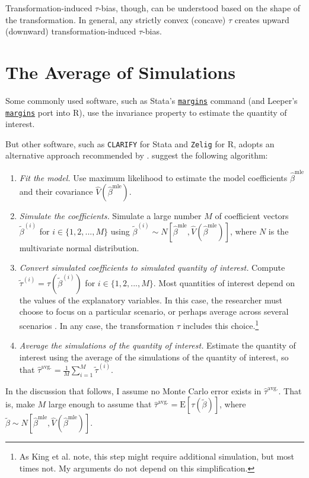 \documentclass[10pt]{article}
\begin{document}
Transformation-induced $\tau$-bias, though, can be understood based on the shape of the transformation. 
In general, any strictly convex (concave) $\tau$ creates upward (downward) transformation-induced $\tau$-bias. 

\section*{The Average of Simulations}

Some commonly used software, such as Stata's \href{https://www.stata.com/help.cgi?margins}{\texttt{margins}} command (and Leeper's \href{https://github.com/leeper/margins}{\texttt{margins}} port into R), use the invariance property to estimate the quantity of interest. 

But other software, such as \texttt{CLARIFY} for Stata and \texttt{Zelig} for R, adopts an alternative approach recommended by \cite{KingTomzWittenberg2000}. \cite{KingTomzWittenberg2000} suggest the following algorithm: 

\begin{enumerate}
\item \textit{Fit the model.} 
Use maximum likelihood to estimate the model coefficients $\hat{\beta}^{\text{mle}}$ and their covariance $\hat{V} \left( \hat{\beta}^{\text{mle}} \right)$.
\item \textit{Simulate the coefficients.} 
Simulate a large number $M$ of coefficient vectors $\tilde{\beta}^{(i)}$ for $i \in \{1, 2, ... , M\}$ using $\tilde{\beta}^{(i)} \sim N \left[ \hat{\beta}^{\text{mle}}, \hat{V} \left( \hat{\beta}^{\text{mle}} \right) \right]$, where $N$ is the multivariate normal distribution. 
\item \textit{Convert simulated coefficients to simulated quantity of interest.} 
Compute $\tilde{\tau}^{(i)} = \tau \left( \tilde{\beta}^{(i)} \right)$ for $i \in \{1, 2, ... , M\}$. 
Most quantities of interest depend on the values of the explanatory variables. 
In this case, the researcher must choose to focus on a particular scenario, or perhaps average across several scenarios \citep{HanmerKalkan2013}. 
In any case, the transformation $\tau$ includes this choice.\footnote{As King et al. note, this step might require additional simulation, but most times not. My arguments do not depend on this simplification.}
\item \textit{Average the simulations of the quantity of interest.} 
Estimate the quantity of interest using the average of the simulations of the quantity of interest, so that $\hat{\tau}^{\text{avg.}} = \frac{1}{M} \sum_{i = 1}^{M} \tilde{\tau}^{(i)}$.
\end{enumerate}
In the discussion that follows, I assume no Monte Carlo error exists in $\hat{\tau}^{\text{avg.}}$. 
That is, make $M$ large enough to assume that $\hat{\tau}^{\text{avg.}} = \text{E}\left[ \tau \left(\tilde{\beta} \right) \right]$, where $\tilde{\beta} \sim N \left[ \hat{\beta}^{\text{mle}}, \hat{V} \left( \hat{\beta}^{\text{mle}} \right) \right]$. 
\end{document}

